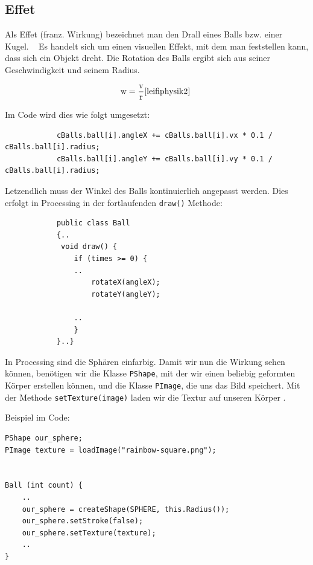 \documentclass[12pt,a4paper]{article}
\begin{document}
		
		\subsection{Effet}
		
		Als Effet (franz. Wirkung) bezeichnet man den Drall eines Balls bzw. einer Kugel. \cite{Wiki}~ Es handelt sich um einen visuellen Effekt, mit dem man feststellen kann, dass sich ein Objekt dreht. Die Rotation des Balls ergibt sich aus seiner Geschwindigkeit und seinem Radius.
		
\[
\text{w} = \frac{\text{v}}{\text{r}} \cite{leifiphysik2}~
\]

		
		Im Code wird dies wie folgt umgesetzt:
		
		\begin{verbatim}
			cBalls.ball[i].angleX += cBalls.ball[i].vx * 0.1 / cBalls.ball[i].radius;
			cBalls.ball[i].angleY += cBalls.ball[i].vy * 0.1 / cBalls.ball[i].radius;
		\end{verbatim}
		
		
		Letzendlich muss der Winkel des Balls kontinuierlich angepasst werden. Dies erfolgt in Processing in der fortlaufenden \texttt{draw()} Methode:
		
		\begin{verbatim}
			public class Ball
			{..
			 void draw() {
				if (times >= 0) {
				..
					rotateX(angleX);     
					rotateY(angleY);      
					
				..
				}
			}..}
		\end{verbatim}
		
		In Processing sind die Sphären einfarbig. Damit wir nun die Wirkung sehen können, benötigen wir die Klasse \texttt{PShape}, mit der wir einen beliebig geformten Körper erstellen können, und die Klasse \texttt{PImage}, die uns das Bild speichert. Mit der Methode \texttt{setTexture(image)} laden wir die Textur auf unseren Körper \cite{processing}.
		
		
		
			\vspace{0.5cm}
		Beispiel im Code:
		
		\begin{verbatim}
PShape our_sphere;
PImage texture = loadImage("rainbow-square.png");


Ball (int count) {
	..
	our_sphere = createShape(SPHERE, this.Radius());
	our_sphere.setStroke(false);
	our_sphere.setTexture(texture);
	..
}

		\end{verbatim}
		
\end{document}
